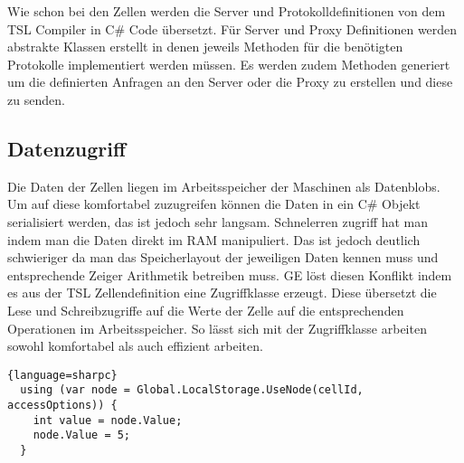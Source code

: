Wie schon bei den Zellen werden die Server und Protokolldefinitionen von dem TSL Compiler in C\# Code übersetzt. Für Server und Proxy
Definitionen werden abstrakte Klassen erstellt in denen jeweils Methoden für die benötigten Protokolle implementiert werden müssen.
Es werden zudem Methoden generiert um die definierten Anfragen an den Server oder die Proxy zu erstellen und diese zu senden.


\subsection{Datenzugriff}

Die Daten der Zellen liegen im Arbeitsspeicher der Maschinen als Datenblobs. Um auf diese komfortabel zuzugreifen können die Daten in ein C\# Objekt
serialisiert werden, das ist jedoch sehr langsam.
Schnelerren zugriff hat man indem man die Daten direkt im RAM manipuliert. Das ist jedoch deutlich schwieriger da man das Speicherlayout der jeweiligen Daten
kennen muss und entsprechende Zeiger Arithmetik betreiben muss. GE löst diesen Konflikt indem es aus der TSL Zellendefinition eine Zugriffklasse erzeugt.
Diese übersetzt die Lese und Schreibzugriffe auf die Werte der Zelle auf die entsprechenden Operationen im Arbeitsspeicher. So lässt sich mit der Zugriffklasse arbeiten sowohl
komfortabel als auch effizient arbeiten.

\begin{lstlisting}{language=sharpc}
  using (var node = Global.LocalStorage.UseNode(cellId, accessOptions)) {
    int value = node.Value;
    node.Value = 5;
  }
\end{lstlisting}
